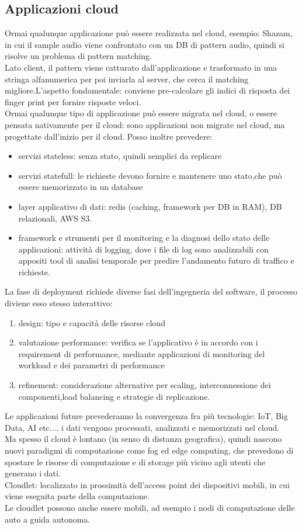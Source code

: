 \documentclass{article}
\begin{document}
\subsection{Applicazioni cloud}
Ormai qualunque applicazione può essere realizzata nel cloud, esempio: Shazam, in cui il sample audio viene confrontato con un DB di pattern audio, quindi si risolve un problema di pattern matching.\\ Lato client, il pattern viene catturato dall'applicazione e trasformato in una stringa alfanumerica per poi inviarla al server, che cerca il matching migliore.L'aspetto fondamentale: conviene pre-calcolare gli indici di risposta dei finger print per fornire risposte veloci.\\ Ormai qualunque tipo di applicazione può essere migrata nel cloud, o essere pensata nativamente per il cloud: sono applicazioni non migrate nel cloud, ma progettate dall'inizio per il cloud. Posso inoltre prevedere:
\begin{itemize}
\item servizi stateless: senza stato, quindi semplici da replicare
\item servizi statefull: le richieste devono fornire e mantenere uno stato,che può essere memorizzato in un database 
\item layer applicativo di dati: redis (caching, framework per DB in RAM), DB relazionali, AWS S3.
\item framework e strumenti per il monitoring e la diagnosi dello stato delle applicazioni: attività di logging, dove i file di log sono analizzabili con appositi tool di analisi temporale per predire l'andamento futuro di traffico e richieste.
\end{itemize}
La fase di deployment richiede diverse fasi dell'ingegneria del software, il processo diviene esso stesso interattivo:
\begin{enumerate}
\item design: tipo e capacità delle risorse cloud
\item valutazione performance: verifica se l'applicativo è in accordo con i requirement di performance, mediante applicazioni di monitoring del workload e dei parametri di performance
\item refinement: considerazione alternative per scaling, interconnessione dei componenti,load balancing e strategie di replicazione.
\end{enumerate}
Le applicazioni future prevederanno la convergenza fra più tecnologie: IoT, Big Data, AI etc..., i dati vengono processati, analizzati e memorizzati nel cloud.\\ Ma spesso il cloud è lontano (in senso di distanza geografica), quindi nascono nuovi paradigmi di computazione come fog ed edge computing, che prevedono di spostare le risorse di computazione e di storage più vicino agli utenti che generano i dati.\\ Cloudlet: localizzato in prossimità dell'access point dei dispositivi mobili, in cui viene eseguita parte della computazione.\\ Le cloudlet possono anche essere mobili, ad esempio i nodi di computazione delle auto a guida autonoma.
\end{document}
